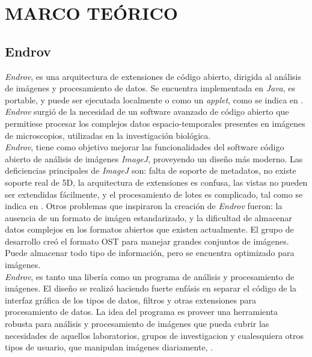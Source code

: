 \thispagestyle{empty}
\cleardoublepage
\chapter{MARCO TE\'ORICO}
\label{sec:dev}
\section{Endrov}
\label{sec:endrov}

\emph{Endrov}, es una arquitectura de extensiones de c\'odigo abierto,
dirigida al an\'alisis de im\'agenes y procesamiento de datos.
Se encuentra implementada en \emph{Java}, es portable, y puede ser ejecutada localmente o como 
un \emph{applet}, como se indica en \cite{web:endrov}. \emph{Endrov} surgi\'o
de la necesidad de un software avanzado de c\'odigo abierto que permitiese procesar 
los complejos datos espacio-temporales presentes en im\'agenes de microscopios, 
utilizadas en la investigaci\'on biol\'ogica.\\

\emph{Endrov}, tiene como objetivo mejorar las funcionalidades del software c\'odigo abierto
de an\'alisis de im\'agenes \emph{ImageJ}, proveyendo un dise\~no m\'as moderno. 
Las deficiencias principales de \emph{ImageJ} son: falta de soporte de metadatos,
no existe soporte real de 5D, la arquitectura de extensiones es confusa, las vistas
no pueden ser extendidas fácilmente, y el procesamiento de lotes es complicado, 
tal como se indica en \cite{web:endrovhome}.
Otros problemas que inspiraron la creaci\'on de \emph{Endrov} fueron: la ausencia de un 
formato de im\'agen estandarizado, y la dificultad
de almacenar datos complejos en los formatos abiertos que existen actualmente.
El grupo de desarrollo cre\'o el formato OST para manejar grandes conjuntos de im\'agenes.
Puede almacenar todo tipo de informaci\'on, pero se encuentra optimizado para im\'agenes.\\

\emph{Endrov}, es tanto una liber\'ia como un programa de an\'alisis y procesamiento de 
im\'agenes. El dise\~no se realiz\'o haciendo fuerte enf\'asis en separar el c\'odigo
de la interfaz gr\'afica de los tipos de datos, filtros y otras extensiones para 
procesamiento de datos. La idea del programa es proveer una herramienta robusta para
an\'alisis y procesamiento de im\'agenes que pueda cubrir las necesidades de aquellos
laboratorios, grupos de investigacion y cualesquiera otros tipos de usuario, que 
manipulan im\'agenes diariamente, \cite{web:endrov}.\\

